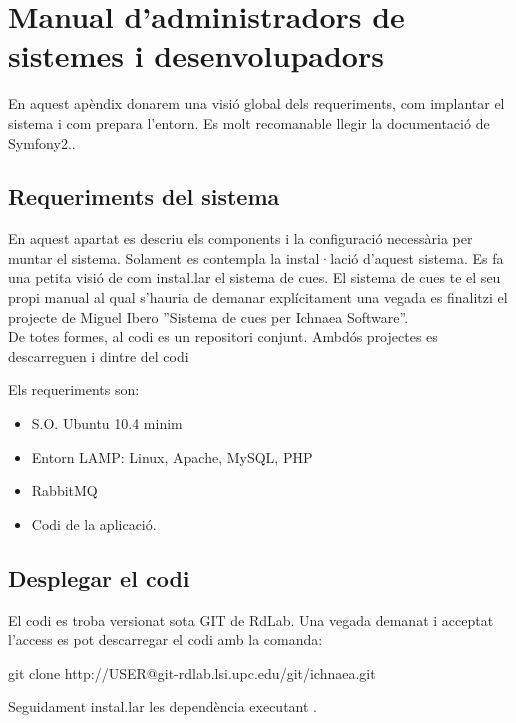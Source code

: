 \chapter{Manual d'administradors de sistemes i desenvolupadors}
\label{cha:userguide}

En aquest apèndix donarem una visió global dels requeriments, com implantar el sistema i com prepara l'entorn. Es molt recomanable llegir la documentació de Symfony2.\cite{symfony}.

\section{Requeriments del sistema}
En aquest apartat es descriu els components i la configuració necessària per muntar el sistema. Solament es contempla la instal·lació d'aquest sistema. Es fa una petita visió de com instal.lar el sistema de cues. El sistema de cues te el seu propi manual al qual s'hauria de demanar explícitament una vegada es finalitzi el projecte de Miguel Ibero ''Sistema de cues per Ichnaea Software''.\\

De totes formes, al codi es un repositori conjunt. Ambdós projectes es descarreguen i dintre del codi 

Els requeriments son:
\begin{itemize}
\item S.O. Ubuntu 10.4 minim
\item Entorn LAMP: Linux, Apache, MySQL, PHP
\item RabbitMQ
\item Codi de la aplicació.
\end{itemize}

\section{Desplegar el codi}
\label{sec:deploy}
El codi es troba versionat sota GIT de RdLab. Una vegada demanat i acceptat l'access es pot descarregar el codi amb la comanda:
\begin{center}
git clone http://USER@git-rdlab.lsi.upc.edu/git/ichnaea.git
\end{center}
Seguidament instal.lar les dependència executant .


